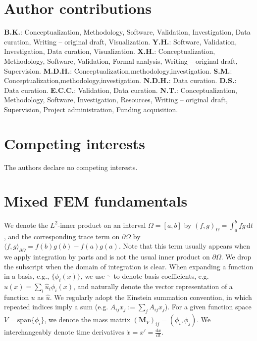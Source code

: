 \documentclass[12pt]{article}
\begin{document}
\section{Author contributions}
\textbf{B.K.}: Conceptualization, Methodology, Software, Validation, Investigation, Data curation, Writing -- original draft, Visualization.
\textbf{Y.H.}: Software, Validation, Investigation, Data curation, Visualization.
\textbf{X.H.}: Conceptualization, Methodology, Software, Validation, Formal analysis, Writing -- original draft, Supervision.
\textbf{M.D.H.}: Conceptualization,methodology,investigation.
\textbf{S.M.}: Conceptualization,methodology,investigation.
\textbf{N.D.H.}: Data curation.
\textbf{D.S.}: Data curation.
\textbf{E.C.C.}: Validation, Data curation.
\textbf{N.T.}: Conceptualization, Methodology, Software, Investigation, Resources, Writing -- original draft, Supervision, Project administration, Funding acquisition.

\section{Competing interests}
The authors declare no competing interests.


\appendix

\section{Mixed FEM fundamentals}
\label{app:mixed_fem}
We denote the $L^2$-inner product on an interval $\Omega = [a,b]$ by $(f,g)_{\Omega} = \int_a^b f g\,\mathrm{d}t$, and the corresponding trace term on $\partial \Omega$ by $\langle f,g\rangle_{\partial \Omega} = f(b)g(b) - f(a)g(a)$. Note that this term usually appears when we apply integration by parts and is not the usual inner product on $\partial \Omega$.  We drop the subscript when the domain of integration is clear. When expanding a function in a basis, e.g., $\{ \phi_i(x) \}$, we use $\hat{\cdot}$ to denote basis coefficients, e.g. $u(x) = \underset{i}{\sum} \hat{u}_i \phi_i(x)$, and naturally denote the vector representation of a function $u$ as $\hat{u}$. We regularly adopt the Einstein summation convention, in which repeated indices imply a sum (e.g. $A_{ij} x_j := \underset{j}{\sum} A_{ij} x_j$). For a given function space $V= \text{span}\{ \phi_i \}$, we denote the mass matrix $(\mathbf{M}_V)_{ij} = (\phi_i,\phi_j)$. We interchangeably denote time derivatives $\dot{x}=x'=\frac{\mathrm{d}x}{\mathrm{d}t}$.
\end{document}
